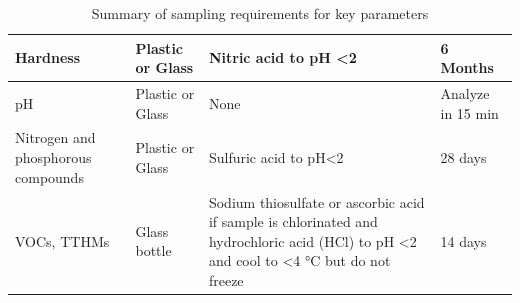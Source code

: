 \begin{table}[h!]
\begin{tabular}{|p{4cm}|p{3cm}|p{4cm}|p{3cm}|}
Hardness                                                                           & Plastic or Glass                                                                   & Nitric   acid to pH \textless 2                                                                                                                              & 6 Months                                                            \\ \hline
pH                                                                                         & Plastic or Glass                                                                   & None                                                                                                                                                         & Analyze in 15 min                                                    \\ \hline
Nitrogen and   phosphorous compounds                                                       & Plastic or Glass                                                                   & Sulfuric acid to   pH\textless{}2                                                                                                                            & 28 days                                                             \\ \hline
VOCs, TTHMs                                                                                & Glass bottle                                                                       & Sodium thiosulfate or   ascorbic acid if sample is chlorinated and hydrochloric acid (HCl) to pH \textless 2  and cool to  \textless 4 °C  but do not freeze & 14 days                                                             \\ \hline
\end{tabular}
\caption{Summary of sampling requirements for key parameters}
\end{table}





